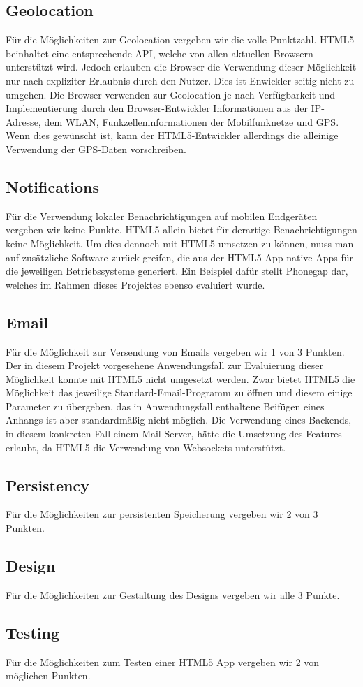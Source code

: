 \subsection{Geolocation}
Für die Möglichkeiten zur Geolocation vergeben wir die volle Punktzahl. HTML5 beinhaltet eine entsprechende API, welche von allen aktuellen Browsern unterstützt wird. Jedoch erlauben die Browser die Verwendung dieser Möglichkeit nur nach expliziter Erlaubnis durch den Nutzer. Dies ist Enwickler-seitig nicht zu umgehen. Die Browser verwenden zur Geolocation je nach Verfügbarkeit und Implementierung durch den Browser-Entwickler Informationen aus der IP-Adresse, dem WLAN, Funkzelleninformationen der Mobilfunknetze und GPS. Wenn dies gewünscht ist, kann der HTML5-Entwickler allerdings die alleinige Verwendung der GPS-Daten vorschreiben.

\subsection{Notifications}
Für die Verwendung lokaler Benachrichtigungen auf mobilen Endgeräten vergeben wir keine Punkte. HTML5 allein bietet für derartige Benachrichtigungen keine Möglichkeit. Um dies dennoch mit HTML5 umsetzen zu können, muss man auf zusätzliche Software zurück greifen, die aus der HTML5-App native Apps für die jeweiligen Betriebssysteme generiert. Ein Beispiel dafür stellt Phonegap dar, welches im Rahmen dieses Projektes ebenso evaluiert wurde.

\subsection{Email}
Für die Möglichkeit zur Versendung von Emails vergeben wir 1 von 3 Punkten. Der in diesem Projekt vorgesehene Anwendungsfall zur Evaluierung dieser Möglichkeit konnte mit HTML5 nicht umgesetzt werden. Zwar bietet HTML5 die Möglichkeit das jeweilige Standard-Email-Programm zu öffnen und diesem einige Parameter zu übergeben, das in Anwendungsfall enthaltene Beifügen eines Anhangs ist aber standardmäßig nicht möglich. Die Verwendung eines Backends, in diesem konkreten Fall einem Mail-Server, hätte die Umsetzung des Features erlaubt, da HTML5 die Verwendung von Websockets unterstützt.

\subsection{Persistency}
Für die Möglichkeiten zur persistenten Speicherung vergeben wir 2 von 3 Punkten.

\subsection{Design}
Für die Möglichkeiten zur Gestaltung des Designs vergeben wir alle 3 Punkte.

\subsection{Testing}
Für die Möglichkeiten zum Testen einer HTML5 App vergeben wir 2 von möglichen Punkten.
